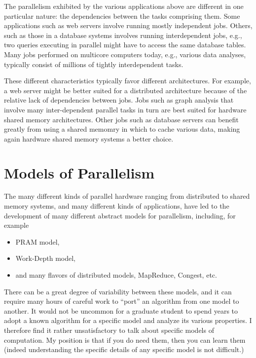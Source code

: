 \begin{gram}
The parallelism exhibited by the various applications above are different in one particular nature: the dependencies between the tasks comprising them.
%
Some applications such as web servers involve running mostly independent jobs.
%
Others, such as those in a database systems involves running interdependent jobs, e.g., two queries executing in parallel might have to access the same database tables.
%
Many jobs performed on multicore computers today, e.g., various data analyses, typically consist of millions of tightly interdependent tasks. 
%

These different characteristics typically favor different architectures.
%
For example, a web server might be better suited for a distributed architecture because of the relative lack of dependencies between jobs.
%
Jobs such as graph analysis that involve many inter-dependent parallel tasks in turn are best suited for hardware shared memory architectures. 
%
Other jobs such as database servers can benefit greatly from using a shared memomry in which to cache various data, making again hardware shared memory systems a better choice.
\end{gram}

\section{Models of Parallelism}

The many different kinds of parallel hardware ranging from distributed to shared memory systems, and many different kinds of applications, have led to the development of many different abstract models for parallelism, including, for example
%
\begin{itemize}
\item PRAM model,
\item Work-Depth model,
\item and many flavors of distributed models, MapReduce, Congest, etc.
\end{itemize}

There can be a great degree of variability between these models, and it can require many hours of careful work to ``port'' an algorithm from one model to another.
%
It would not be uncommon for a graduate student to spend years to adopt a known algorithm for a specific model and analyze its various properties.
%
I therefore find it rather unsatisfactory to talk about specific models of computation.  
%
My position is that if you do need them, then you can learn them (indeed understanding the specific details of any specific model is not difficult.)
%

